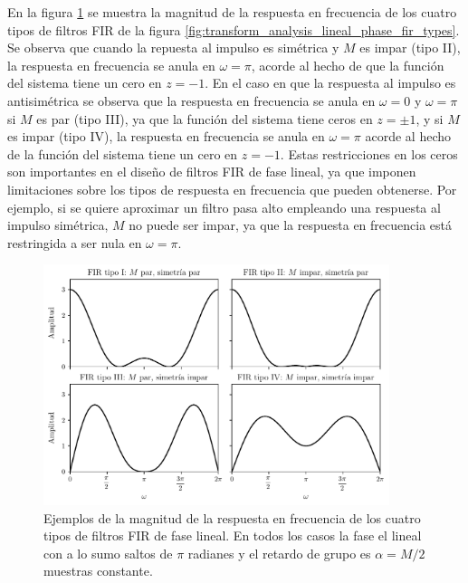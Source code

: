 \documentclass[a4paper]{report}
\begin{document}
En la figura \ref{fig:transform_analysis_lineal_phase_fir_types_freq_responses} se muestra la magnitud de la respuesta en frecuencia de los cuatro tipos de filtros FIR de la figura \ref{fig:transform_analysis_lineal_phase_fir_types}. Se observa que cuando la repuesta al impulso es simétrica y \(M\) es impar (tipo II), la respuesta en frecuencia se anula en \(\omega=\pi\), acorde al hecho de que la función del sistema tiene un cero en \(z=-1\). En el caso en que la respuesta al impulso es antisimétrica se observa que la respuesta en frecuencia se anula en \(\omega=0\) y \(\omega=\pi\) si \(M\) es par (tipo III), ya que la función del sistema tiene ceros en \(z=\pm1\), y si \(M\) es impar (tipo IV), la respuesta en frecuencia se anula en \(\omega=\pi\) acorde al hecho de la función del sistema tiene un cero en \(z=-1\).
Estas restricciones en los ceros son importantes en el diseño de filtros FIR de fase lineal, ya que imponen limitaciones sobre los tipos de respuesta en frecuencia que pueden obtenerse. Por ejemplo, si se quiere aproximar un filtro pasa alto empleando una respuesta al impulso simétrica, \(M\) no puede ser impar, ya que la respuesta en frecuencia está restringida a ser nula en \(\omega=\pi\).
\begin{figure}[!htb]
 \begin{center}
 \includegraphics[width=0.9\textwidth]{figuras/transform_analysis_lineal_phase_fir_types_freq_responses.pdf}
 \caption{\label{fig:transform_analysis_lineal_phase_fir_types_freq_responses} Ejemplos de la magnitud de la respuesta en frecuencia de los cuatro tipos de filtros FIR de fase lineal. En todos los casos la fase el lineal con a lo sumo saltos de \(\pi\) radianes y el retardo de grupo es \(\alpha=M/2\) muestras constante.}
 \end{center}
\end{figure} 
\end{document}
